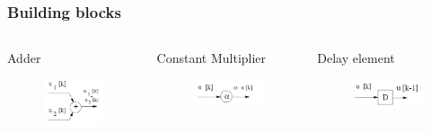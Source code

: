 \begin{frame}
	\frametitle{Building blocks}
	\begin{columns}
		\begin{column}{0.33\textwidth}
			\begin{block}{Adder}
				\begin{figure}
				\centering
				\includegraphics[width=0.7\linewidth]{Images/discrete_time_systems_15}
				\label{fig:discrete_time_systems_15}
			\end{figure}

			\end{block}
		\end{column}
		\begin{column}{0.33\textwidth}
				\begin{block}{Constant Multiplier}
					\begin{figure}
					\centering
					\includegraphics[width=0.7\linewidth]{Images/discrete_time_systems_16}
					\label{fig:discrete_time_systems_16}
					\end{figure}

				\end{block}
		\end{column}
		\begin{column}{0.33\textwidth}
			\begin{block}{Delay element}
				\begin{figure}
					\centering
					\includegraphics[width=0.7\linewidth]{Images/discrete_time_systems_17}
					\label{fig:discrete_time_systems_17}
				\end{figure}
			\end{block}
		\end{column}
	\end{columns}
\end{frame}
